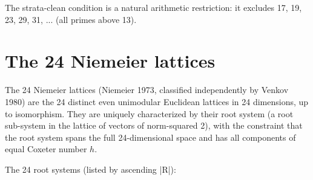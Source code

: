\documentclass[11pt,reqno]{amsart}
\theoremstyle{plain}
\theoremstyle{definition}
\begin{document}
The strata-clean condition is a natural arithmetic restriction: it excludes 17, 19, 23, 29, 31, ... (all primes above 13).

\section{The 24 Niemeier lattices}

The 24 Niemeier lattices (Niemeier 1973, classified independently by Venkov 1980) are the 24 distinct even unimodular Euclidean lattices in 24 dimensions, up to isomorphism. They are uniquely characterized by their root system (a root sub-system in the lattice of vectors of norm-squared 2), with the constraint that the root system spans the full 24-dimensional space and has all components of equal Coxeter number $h$.

The 24 root systems (listed by ascending |R|):
\end{document}
